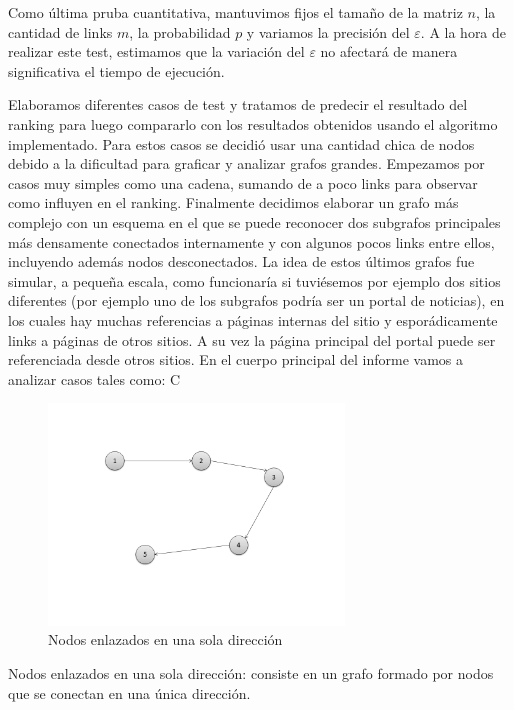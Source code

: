 \par
Como \'ultima pruba cuantitativa, mantuvimos fijos el tama\~no de la matriz $n$, la cantidad de links $m$, la probabilidad $p$ y variamos la precisi\'on del $\varepsilon$.
A la hora de realizar este test, estimamos que la variaci\'on del $\varepsilon$ no afectar\'a de manera significativa el tiempo de ejecuci\'on.

\par
Elaboramos diferentes casos de test y tratamos de predecir el resultado del ranking para luego compararlo con los resultados obtenidos usando el algoritmo implementado. Para estos casos se decidió usar una cantidad chica de nodos debido a la dificultad para graficar y analizar grafos grandes.
Empezamos por casos muy simples como una cadena, sumando de a poco links para observar como influyen en el ranking.
Finalmente decidimos elaborar un grafo m\'as complejo con un esquema en el que se puede reconocer dos subgrafos principales m\'as densamente conectados internamente y con algunos pocos links entre ellos, incluyendo además nodos desconectados. La idea de estos últimos grafos fue simular, a pequeña escala, como funcionaría si tuviésemos por ejemplo dos sitios diferentes (por ejemplo uno de los subgrafos podría ser un portal de noticias), en los cuales hay muchas referencias a páginas internas del sitio y espor\'adicamente links a p\'aginas de otros sitios. A su vez la página principal del portal puede ser referenciada desde otros sitios. En el cuerpo principal del informe vamos a analizar casos tales como:
C\begin{figure}
	\centering
	\includegraphics[width=0.7\textwidth]{img/cadena4.png}
	\caption{Nodos enlazados en una sola direcci\'on}
	\label{fig:Nodos enlazados en una sola direcci\'on}
\end{figure}
Nodos enlazados en una sola direcci\'on: consiste en un grafo formado por nodos que se conectan en una \'unica direcci\'on.
